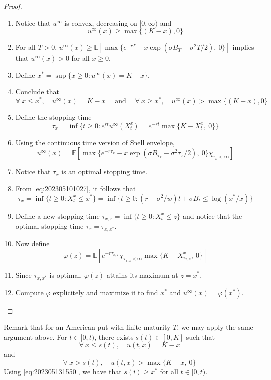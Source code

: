 \begin{proof}
    \begin{enumerate}
        \item Notice that $u^\infty$ is convex, decreasing on $[0, \infty)$ and \[ u^\infty(x) \ge \max \{(K-x), 0 \} \]
        \item For all $T > 0$, $u^\infty(x) \ge \mathbb{E} [\max \{ e^{-r T} -x \exp(\sigma B_T - \sigma^2 T/2), ~0 \}]$ implies that $u^\infty(x) > 0$ for all $x \ge 0$.
        \item Define $x^\ast = \sup \{x \ge 0 : u^\infty(x) = K - x \}$.
        \item Conclude that \begin{equation}\label{eq:202305101027}
            \forall ~x \leq x^\ast, \quad u^\infty(x) = K - x \quad \text{ and } \quad \forall ~x \ge x^\ast, \quad u^\infty(x) > \max \{ (K-x), 0 \}
        \end{equation}
        \item Define the stopping time \[ \tau_x = \inf \{ t \ge 0 : e^{rt} u^\infty(X_t^x) = e^{-rt} \max \{K - X_t^x, ~0\} \} \]
        \item Using the continuous time version of Snell envelope, \[ u^\infty(x) = \mathbb{E}[\max \{ e^{-r \tau_x} -x \exp(\sigma B_{\tau_x} - \sigma^2 \tau_x/2), ~0 \} \chi_{\tau_x < \infty}] \]
        \item Notice that $\tau_x$ is an optimal stopping time.
        \item From \eqref{eq:202305101027}, it follows that \[ \tau_x = \inf \{ t \ge 0 : X_t^x \le x^\ast \} = \inf \{ t \ge 0 : (r - \sigma^2/w)t + \sigma B_t \le \log(x^\ast / x)\} \]
        \item Define a new stopping time $\tau_{x, z} = \inf \{ t \ge 0 : X_t^x \le z \}$ and notice that the optimal stopping time $\tau_x = \tau_{x, x^\ast}$. 
        \item Now define \[ \varphi(z) = \mathbb{E} \left[ e^{-r\tau_{x, z}} \chi_{\tau_{x, z} < \infty} \max \{ K  - X_{\tau_{x, z}}^x, ~0\} \right]\]
        \item Since $\tau_{x, x^\ast}$ is optimal, $\varphi(z)$ attains its maximum at $z = x^\ast$. 
        \item Compute $\varphi$ explicitely and maximize it to find $x^\ast$ and $u^\infty(x) = \varphi(x^\ast)$.
    \end{enumerate}
\end{proof}

Remark that for an American put with finite maturity $T$, we may apply the same argument above. For $t \in [0, t)$, there exists $s(t) \in [0, K]$ such that 
\[
    \forall ~x \le s(t), \quad u(t,x) = K-x   
\]
and 
\[
    \forall ~x > s(t), \quad u(t,x) > \max \{K-x, ~0 \}
\]
Using \eqref{eq:202305131550}, we have that $s(t) \ge x^\ast$ for all $t \in [0, t)$. 

